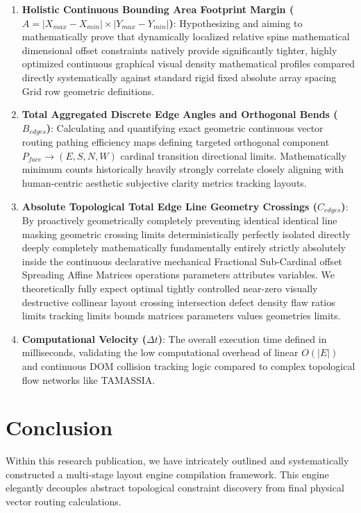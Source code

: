 \documentclass[fleqn,10pt]{wlscirep}
\begin{document}
\begin{enumerate}
    \item \textbf{Holistic Continuous Bounding Area Footprint Margin ($A = |X_{max} - X_{min}| \times |Y_{max} - Y_{min}|$)}: Hypothesizing and aiming to mathematically prove that dynamically localized relative spine mathematical dimensional offset constraints natively provide significantly tighter, highly optimized continuous graphical visual density mathematical profiles compared directly systematically against standard rigid fixed absolute array spacing Grid row geometric definitions.
    
    \item \textbf{Total Aggregated Discrete Edge Angles and Orthogonal Bends ($B_{edges}$)}: Calculating and quantifying exact geometric continuous vector routing pathing efficiency maps defining targeted orthogonal component $P_{face} \to (E, S, N, W)$ cardinal transition directional limits. Mathematically minimum counts historically heavily strongly correlate closely aligning with human-centric aesthetic subjective clarity metrics tracking layouts.
    
    \item \textbf{Absolute Topological Total Edge Line Geometry Crossings ($C_{edges}$)}: By proactively geometrically completely preventing identical identical line masking geometric crossing limits deterministically perfectly isolated directly deeply completely mathematically fundamentally entirely strictly absolutely inside the continuous declarative mechanical Fractional Sub-Cardinal offset Spreading Affine Matrices operations parameters attributes variables. We theoretically fully expect optimal tightly controlled near-zero visually destructive collinear layout crossing intersection defect density flaw ratios limits tracking limits bounds matrices parameters values geometries limits.
    
    \item \textbf{Computational Velocity ($\Delta t$)}: The overall execution time defined in milliseconds, validating the low computational overhead of linear $O(|E|)$ and continuous DOM collision tracking logic compared to complex topological flow networks like TAMASSIA.
\end{enumerate}

\section*{Conclusion}
Within this research publication, we have intricately outlined and systematically constructed a multi-stage layout engine compilation framework. This engine elegantly decouples abstract topological constraint discovery from final physical vector routing calculations. 
\end{document}
